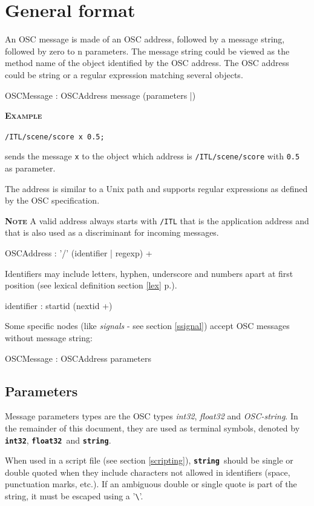 \documentclass[a4paper,twoside]{report}
\newcommand{\toplevel}[1]	{\chapter{#1}}
\newcommand{\sublevel}[1]	{\section{#1}}
\newcommand{\fullref}[1]	{\ref{#1} p.\pageref{#1}}
\newcommand{\OSC}[1]		{\texttt{#1}}
\newcommand{\example}		{\textbf{\hspace{-1.5cm}\textbf{\textsc{Example }}}}
\newcommand{\note}	[1]		{\vspace{2mm}\textbf{\hspace{-1.03cm}\textbf{\textsc{Note #1}}}}
\newcommand{\osctype}[1]	{\textbf{\texttt{{\small #1}}}}
\newcommand{\oscint}		{\osctype{int32}}
\newcommand{\oscfloat}		{\osctype{float32}}
\newcommand{\oscstring}		{\osctype{string}}
\newcommand{\sample}	[1]			{\vspace{-2mm}\begin{center}\colorbox{mygrey}{
								\begin{minipage}[t]{0.9\columnwidth} 
								{\small \texttt{#1}}
								\end{minipage}}\end{center}}
\begin{document}
\newpage

\setcounter{page}{1}

\toplevel{General format}
\label{genformat}
An OSC message is made of an OSC address, followed by a message string, followed by zero to n parameters. The message string could be viewed as the method name of the object identified by the OSC address.
The OSC address could be string or a regular expression matching several objects.
\begin{rail}
OSCMessage : OSCAddress message (parameters |)
\end{rail}
\example
\sample{/ITL/scene/score x 0.5;}
sends the message \OSC{x} to the object which address is \OSC{/ITL/scene/score} with \OSC{0.5} as parameter.

The address is similar to a Unix path and supports regular expressions as defined by the OSC specification. 

\note{} A valid address always starts with \OSC{/ITL} that is the application address and that is also used as a discriminant for incoming messages.
\begin{rail}
OSCAddress : '/' (identifier | regexp) +
\end{rail}

Identifiers may include letters, hyphen, underscore and numbers apart at first position (see lexical definition section \fullref{lex}).
\railalias{nextid}{[-\_a-zA-Z0-9]]}
\begin{rail}
identifier : startid (nextid +)
\end{rail}

Some specific nodes (like \emph{signals} - see section \ref{ssignal}) accept OSC messages without message string:
\begin{rail}
OSCMessage : OSCAddress parameters
\end{rail}

\sublevel{Parameters}

Message parameters types are the OSC types \emph{int32}, \emph{float32} and \emph{OSC-string}. In the remainder of this document, they are used as terminal symbols, denoted by \oscint, \oscfloat\ and \oscstring. 

When used in a script file (see section \ref{scripting}), \oscstring\ should be single or double quoted when they include characters not allowed in identifiers (space, punctuation marks, etc.).
If an ambiguous double or single quote is part of the string, it must be escaped using a '\verb+\+'.
\end{document}
